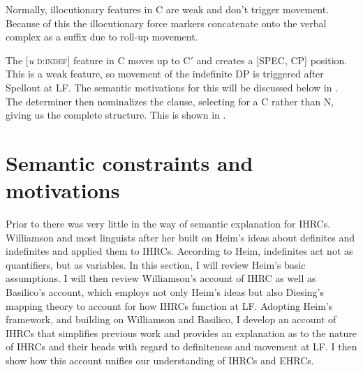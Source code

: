 \documentclass[output=paper]{LSP/langsci}
\begin{document}
Normally, illocutionary features in C are weak and don't trigger movement. Because of this the illocutionary force markers concatenate onto the verbal complex as a suffix due to roll-up movement.  

The [\textit{u} \textsc{d:indef}] feature in C moves up to C$'$ and creates a [SPEC, CP] position. This is a weak feature, so movement of the indefinite DP is triggered after Spellout at LF. The semantic motivations for this will be discussed below in . The determiner then nominalizes the clause, selecting for a C rather than N, giving us the complete  structure. This is shown in .  

\ea\label{boyle38}
{\hspace{1em}}\newline

\z          
      
\section{Semantic constraints and motivations}\label{sec:boyle:6}

Prior to \citet{Williamson1987} there was very little in the way of semantic explanation for IHRCs. Williamson and most linguists after her built on Heim's \citeyearpar{Heim1982} ideas about definites and indefinites and applied them to IHRCs. According to Heim, indefinites act not as quantifiers, but as variables.  In this section, I will review Heim's basic assumptions. I will then review Williamson's account of IHRC \citeyearpar{Williamson1987} as well as Basilico's \citeyear{Basilico1996} account, which employs not only Heim's ideas but also Diesing's mapping theory \citeyearpar{Diesing1990, Diesing1992a, Diesing1992b} to account for how IHRCs function at LF. Adopting Heim's framework, and building on Williamson and Basilico, I develop an account of IHRCs that simplifies previous work and provides an explanation as to the nature of IHRCs and their heads with regard to definiteness and movement at LF. I then show how this account unifies our understanding of IHRCs and EHRCs.
\end{document}

